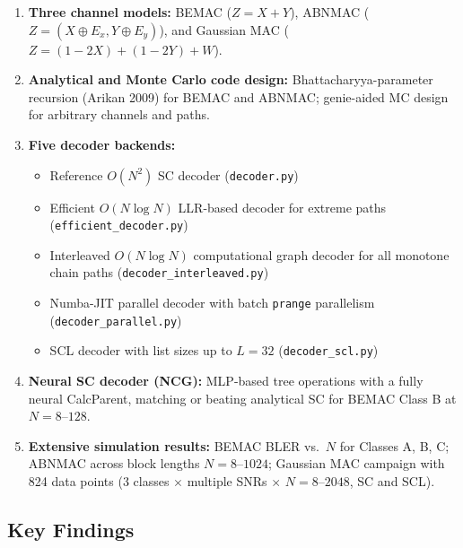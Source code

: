 \documentclass[11pt,a4paper]{article}
\begin{document}
\begin{enumerate}[label=(\arabic*)]
  \item \textbf{Three channel models:} BEMAC ($Z = X + Y$), ABNMAC
        ($Z = (X \oplus E_x, Y \oplus E_y)$), and Gaussian MAC
        ($Z = (1{-}2X) + (1{-}2Y) + W$).

  \item \textbf{Analytical and Monte Carlo code design:}
        Bhattacharyya-parameter recursion (Arikan 2009) for BEMAC and ABNMAC;
        genie-aided MC design for arbitrary channels and paths.

  \item \textbf{Five decoder backends:}
        \begin{itemize}
          \item Reference $O(N^2)$ SC decoder (\texttt{decoder.py})
          \item Efficient $O(N \log N)$ LLR-based decoder for extreme paths (\texttt{efficient\_decoder.py})
          \item Interleaved $O(N \log N)$ computational graph decoder for all
                monotone chain paths (\texttt{decoder\_interleaved.py})
          \item Numba-JIT parallel decoder with batch \texttt{prange} parallelism
                (\texttt{decoder\_parallel.py})
          \item SCL decoder with list sizes up to $L = 32$
                (\texttt{decoder\_scl.py})
        \end{itemize}

  \item \textbf{Neural SC decoder (NCG):}
        MLP-based tree operations with a fully neural CalcParent,
        matching or beating analytical SC for BEMAC Class B at $N = 8$--$128$.

  \item \textbf{Extensive simulation results:}
        BEMAC BLER vs.\ $N$ for Classes A, B, C; ABNMAC across block lengths
        $N = 8$--$1024$; Gaussian MAC campaign with 824 data points
        (3 classes $\times$ multiple SNRs $\times$ $N = 8$--$2048$, SC and SCL).
\end{enumerate}

\subsection{Key Findings}
\end{document}
